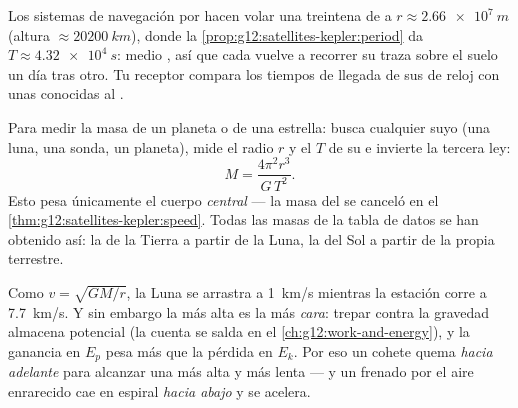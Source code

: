 \begin{example}\label{ex:g12:satellites-kepler:gps}
Los sistemas de navegación por  hacen volar una treintena de  a
$r \approx \qty{2.66e7}{m}$ (altura $\approx \qty{20200}{km}$), donde la
\cref{prop:g12:satellites-kepler:period} da $T \approx \qty{4.32e4}{s}$: medio , así que cada  vuelve a recorrer su traza sobre el suelo un día tras
otro. Tu receptor compara los tiempos de llegada de sus  de reloj con unas
 conocidas al .
\end{example}

\begin{method}\label{met:g12:satellites-kepler:weigh}
%
Para medir la masa de un planeta o de una estrella: busca cualquier  suyo (una
luna, una sonda, un planeta), mide el radio $r$ y el  $T$ de su  e
invierte la tercera ley:
\[ M = \frac{4\pi^2 r^3}{G\,T^2}. \]
Esto pesa únicamente el cuerpo \emph{central} --- la masa del  se canceló en
el \cref{thm:g12:satellites-kepler:speed}. Todas las masas de la tabla de datos se han
obtenido así: la de la Tierra a partir de la Luna, la del Sol a partir de la propia
 terrestre.
\end{method}

\begin{remark}\label{rem:g12:satellites-kepler:energy}
Como $v = \sqrt{GM/r}$, la Luna se arrastra a \qty{1}{km/s} mientras la estación corre
a \qty{7.7}{km/s}. Y sin embargo la  más alta es la más \emph{cara}: trepar
contra la gravedad almacena  potencial (la cuenta se salda en el
\cref{ch:g12:work-and-energy}), y la ganancia en $E_p$ pesa más que la pérdida en
$E_k$. Por eso un cohete quema \emph{hacia adelante} para alcanzar una  más alta
y más lenta --- y un  frenado por el aire enrarecido cae en espiral \emph{hacia
abajo} y se acelera.
\end{remark}

